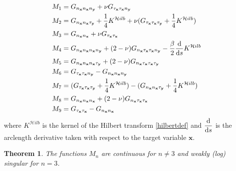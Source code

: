 \documentclass[preprint,12pt,3p]{elsarticle}
\newtheorem{thm}{Theorem}
\newcommand{\dd}{ {\rm d} }
\begin{document}
\begin{align}
    M_{1} & =  G_{n_\mathbf{x} n_\mathbf{x} n_\mathbf{y}} + \nu G_{\tau_\mathbf{x} \tau_\mathbf{x} n_\mathbf{y}} \label{first_free_ker1} \\
    M_{2} &= G_{n_\mathbf{x} n_\mathbf{x} \tau_\mathbf{y}}  + \frac{1}{4}K^{\mathcal{H}ilb} +   \nu (G_{\tau_\mathbf{x} \tau_\mathbf{x} \tau_\mathbf{y}} + \frac{1}{4}K^{\mathcal{H}ilb})\\
    M_{3} &=  G_{n_\mathbf{x} n_\mathbf{x}} + \nu G_{\tau_\mathbf{x} \tau_\mathbf{x}}\\
    M_{4} &= G_{n_\mathbf{x} n_\mathbf{x} n_\mathbf{x} n_\mathbf{y}} + (2-\nu)G_{n_\mathbf{x} \tau_\mathbf{x}\tau_\mathbf{x} n_\mathbf{y}} - \frac{\beta}{2} \frac{\dd}{\dd s} K^{\mathcal{H}ilb} \\
    M_{5} &=  G_{n_\mathbf{x} n_\mathbf{x} n_\mathbf{x}\tau_\mathbf{y} } + (2-\nu) G_{n_\mathbf{x} \tau_\mathbf{x} \tau_\mathbf{x} \tau_\mathbf{y} } \\
    M_{6} &= G_{\tau_\mathbf{x} \tau_\mathbf{x} n_\mathbf{y}} -  G_{n_\mathbf{x} n_\mathbf{x} n_\mathbf{y}}\\
    M_{7} &= (G_{\tau_\mathbf{x} \tau_\mathbf{x} \tau_\mathbf{y}} + \frac{1}{4}K^{\mathcal{H}ilb}) - (G_{n_\mathbf{x} n_\mathbf{x} \tau_\mathbf{y} } + \frac{1}{4}K^{\mathcal{H}ilb}) \\
    M_{8} &= G_{n_\mathbf{x} n_\mathbf{x} n_\mathbf{x}} + (2-\nu) G_{n_\mathbf{x} \tau_\mathbf{x} \tau_\mathbf{x} } \\
    M_{9} &= G_{\tau_\mathbf{x} \tau_\mathbf{x}} -  G_{n_\mathbf{x} n_\mathbf{x}} \label{last_free_ker1}
\end{align}
where $K^{\mathcal{H}ilb}$ is the kernel of the Hilbert transform \eqref{hilbertdef} and $\displaystyle\frac{\dd}{\dd s}$ is the arclength derivative taken with respect to the target variable $\mathbf{x}$.

\begin{thm}
The functions $M_{n}$ are continuous for $n \neq 3$ and weakly (log) singular for $n = 3$. \label{freesmooth}
\end{thm}
\end{document}

